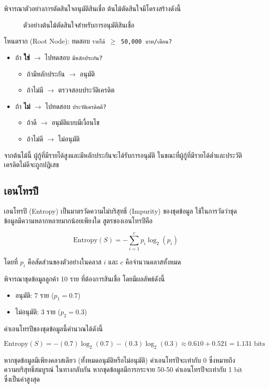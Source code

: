\begin{exmp}
\label{exmp:decision_tree_structure}
พิจารณาตัวอย่างการตัดสินใจอนุมัติสินเชื่อ ต้นไม้ตัดสินใจมีโครงสร้างดังนี้

\begin{figure}[h!]
\centering
\caption{ตัวอย่างต้นไม้ตัดสินใจสำหรับการอนุมัติสินเชื่อ}
\label{fig:loan_decision_tree}
\end{figure}

โหนดราก (Root Node): ทดสอบ \texttt{รายได้ $\geq$ 50,000 บาท/เดือน?}
\begin{itemize}
\item ถ้า \textbf{ใช่} $\rightarrow$ ไปทดสอบ \texttt{มีหลักประกัน?}
  \begin{itemize}
  \item ถ้ามีหลักประกัน $\rightarrow$ อนุมัติ
  \item ถ้าไม่มี $\rightarrow$ ตรวจสอบประวัติเครดิต
  \end{itemize}
\item ถ้า \textbf{ไม่} $\rightarrow$ ไปทดสอบ \texttt{ประวัติเครดิตดี?}
  \begin{itemize}
  \item ถ้าดี $\rightarrow$ อนุมัติแบบมีเงื่อนไข
  \item ถ้าไม่ดี $\rightarrow$ ไม่อนุมัติ
  \end{itemize}
\end{itemize}

จากต้นไม้นี้ ผู้กู้ที่มีรายได้สูงและมีหลักประกันจะได้รับการอนุมัติ ในขณะที่ผู้กู้ที่มีรายได้ต่ำและประวัติเครดิตไม่ดีจะถูกปฏิเสธ
\end{exmp}

\subsection{เอนโทรปี}
เอนโทรปี (Entropy) เป็นมาตรวัดความไม่บริสุทธิ์ (Impurity) ของชุดข้อมูล ใช้ในการวัดว่าชุดข้อมูลมีความหลากหลายมากน้อยเพียงใด สูตรของเอนโทรปีคือ

\[
\text{Entropy}(S) = -\sum_{i=1}^{c} p_i \log_2(p_i)
\]

โดยที่ $p_i$ คือสัดส่วนของตัวอย่างในคลาส $i$ และ $c$ คือจำนวนคลาสทั้งหมด

\begin{exmp}
\label{exmp:entropy_calculation}
พิจารณาชุดข้อมูลลูกค้า 10 ราย ที่ต้องการสินเชื่อ โดยมีผลลัพธ์ดังนี้
\begin{itemize}
\item อนุมัติ: 7 ราย ($p_1 = 0.7$)
\item ไม่อนุมัติ: 3 ราย ($p_2 = 0.3$)
\end{itemize}

ค่าเอนโทรปีของชุดข้อมูลนี้คำนวณได้ดังนี้

\[
\text{Entropy}(S) = -(0.7)\log_2(0.7) - (0.3)\log_2(0.3) \approx 0.610 + 0.521 = 1.131 \text{ bits}
\]

หากชุดข้อมูลมีเพียงคลาสเดียว (ทั้งหมดอนุมัติหรือไม่อนุมัติ) ค่าเอนโทรปีจะเท่ากับ 0 ซึ่งหมายถึงความบริสุทธิ์สมบูรณ์ ในทางกลับกัน หากชุดข้อมูลมีการกระจาย 50-50 ค่าเอนโทรปีจะเท่ากับ 1 bit ซึ่งเป็นค่าสูงสุด
\end{exmp}

